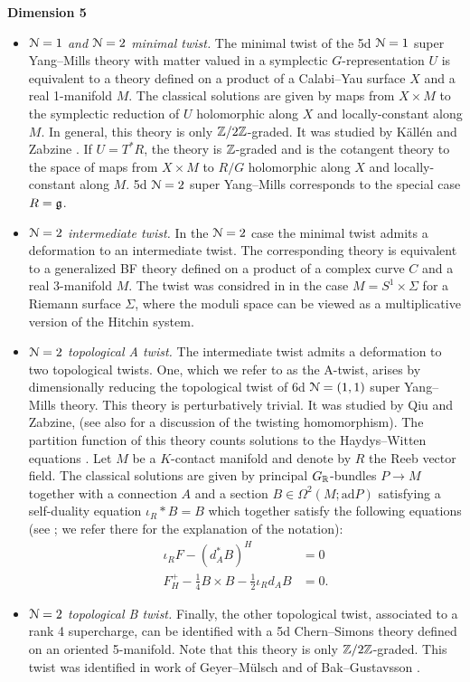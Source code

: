 \documentclass[10pt, oneside]{article}
\begin{document}
\textbf{Dimension 5}
\begin{itemize}
 \item \emph{$\mathcal{N}=1$ and $\mathcal{N}=2$ minimal twist.} The minimal twist of the 5d $\mathcal N=1$ super Yang--Mills theory with matter valued in a symplectic $G$-representation $U$ is equivalent to a theory defined on a product of a Calabi--Yau surface $X$ and a real 1-manifold $M$. The classical solutions are given by maps from $X\times M$ to the symplectic reduction of $U$ holomorphic along $X$ and locally-constant along $M$. In general, this theory is only $\mathbb Z/2\mathbb Z$-graded. It was studied by K\"all\'en and Zabzine \cite{KallenZabzine}. If $U=T^* R$, the theory is $\mathbb Z$-graded and is the cotangent theory to the space of maps from $X\times M$ to $R/G$ holomorphic along $X$ and locally-constant along $M$. 5d $\mathcal N=2$ super Yang--Mills corresponds to the special case $R=\mathfrak g$.
 \item \emph{$\mathcal{N}=2$ intermediate twist.} In the $\mathcal{N}=2$ case the minimal twist admits a deformation to an intermediate twist. The corresponding theory is equivalent to a generalized BF theory defined on a product of a complex curve $C$ and a real 3-manifold $M$. The twist was considred in \cite{ElliottPestun} in the case $M=S^1\times \Sigma$ for a Riemann surface $\Sigma$, where the moduli space can be viewed as a multiplicative version of the Hitchin system.
 \item \emph{$\mathcal{N}=2$ topological A twist.} The intermediate twist admits a deformation to two topological twists. One, which we refer to as the A-twist, arises by dimensionally reducing the topological twist of 6d $\mathcal{N}=(1, 1)$ super Yang--Mills theory. This theory is perturbatively trivial. It was studied by Qiu and Zabzine, \cite{QiuZabzine} (see also \cite{Anderson} for a discussion of the twisting homomorphism). The partition function of this theory counts solutions to the Haydys--Witten equations \cite{Haydys,WittenFivebranes}. Let $M$ be a $K$-contact manifold and denote by $R$ the Reeb vector field. The classical solutions are given by principal $G_\mathbb R$-bundles $P\rightarrow M$ together with a connection $A$ and a section $B\in\Omega^2(M; \mathrm{ad} P)$ satisfying a self-duality equation $\iota_R \ast B = B$ which together satisfy the following equations (see \cite[equations (4) and (5)]{QiuZabzine}; we refer there for the explanation of the notation):
\begin{align}
\iota_R F - (d_A^* B)^H &= 0 \\
F^+_H - \frac{1}{4}B\times B - \frac{1}{2}\iota_R d_A B &= 0.
\end{align} 
 \item \emph{$\mathcal{N}=2$ topological B twist.} Finally, the other topological twist, associated to a rank 4 supercharge, can be identified with a 5d Chern--Simons theory defined on an oriented 5-manifold. Note that this theory is only $\mathbb Z/2\mathbb Z$-graded. This twist was identified in work of Geyer--M\"ulsch and of Bak--Gustavsson \cite{GeyerMuelsch, BakGustavsson1,BakGustavsson2}.
\end{itemize}
\end{document}
